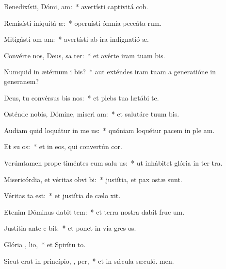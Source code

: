 \item Benedixísti, Dómi,  am:~* avertísti captivitá cob.
\item Remisísti iniquitá  æ:~* operuísti ómnia peccáta rum.
\item Mitigásti om  am:~* avertísti ab ira indignatió æ.
\item Convérte nos, Deus, sa ter:~* et avérte iram tuam  bis.
\item Numquid in ætérnum i bis?~* aut exténdes iram tuam a generatióne in generanem?
\item Deus, tu convérsus bis nos:~* et plebs tua lætábi  te.
\item Osténde nobis, Dómine, miseri am:~* et salutáre tuum  bis.
\item Audiam quid loquátur in me  us:~* quóniam loquétur pacem in ple am.
\item Et su  os:~* et in eos, qui convertún  cor.
\item Verúmtamen prope timéntes eum salu us:~* ut inhábitet glória in ter tra.
\item Misericórdia, et véritas obvi bi:~* justítia, et pax ostæ sunt.
\item Véritas   ta est:~* et justítia de cælo xit.
\item Etenim Dóminus dabit tem:~* et terra nostra dabit fruc um.
\item Justítia ante e bit:~* et ponet in via gres os.
\item Glória ,  lio,~* et Spirítu to.
\item Sicut erat in princípio,  ,  per,~* et in sǽcula sæculó. men.
